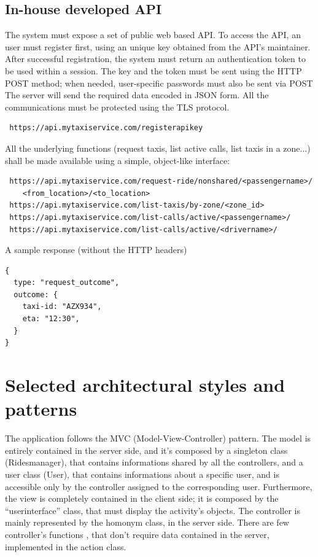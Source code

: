 \subsection{In-house developed API}
The system must expose a set of public web based API. To access the API, an user must register first, using an unique key
obtained from the API's maintainer.
After successful registration, the system must return an authentication token to be used within a session.
The key and the token must be sent using the HTTP POST method; when needed, user-specific passwords must also
be sent via POST
The server will send the required data encoded in JSON form.
All the communications must be protected using the TLS protocol.
\begin{verbatim}
 https://api.mytaxiservice.com/registerapikey
\end{verbatim}
All the underlying functions (request taxis, list active calls, list taxis in a zone...) shall be made available using a simple,
object-like interface:
\begin{verbatim}
 https://api.mytaxiservice.com/request-ride/nonshared/<passengername>/
    <from_location>/<to_location>
 https://api.mytaxiservice.com/list-taxis/by-zone/<zone_id>
 https://api.mytaxiservice.com/list-calls/active/<passengername>/
 https://api.mytaxiservice.com/list-calls/active/<drivername>/
\end{verbatim}
A sample response (without the HTTP headers)
\begin{verbatim}
{
  type: "request_outcome",
  outcome: {
    taxi-id: "AZX934",
    eta: "12:30",
  }
}
\end{verbatim}

\section{Selected architectural styles and patterns}
The application follows the MVC (Model-View-Controller) pattern.
The model is entirely contained in the server side, and it's composed by a singleton class (Ridesmanager), that contains 
informations shared by all the controllers, and a user class (User), that contains informations about a specific user, and is
accessible only by the controller assigned to the corresponding user.
Furthermore, the view is completely contained in the client side; it is composed by the ``userinterface'' class, that must display
the activity's objects.
The controller is mainly represented by the homonym class, in the server side. There are few controller's functions , that don't 
require data contained in the server, implemented in the action class.

